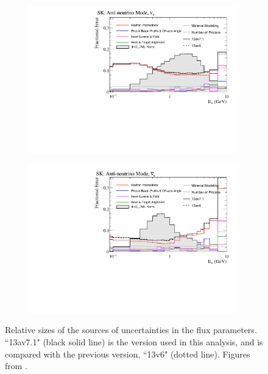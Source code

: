 \begin{figure}
\begin{subfigure}{.49\textwidth}
\end{subfigure}
\begin{subfigure}{.49\textwidth}
  \centering
  \includegraphics[width=0.99\linewidth]{figs/flux_error_t2k_sk_rhc_nue}
\end{subfigure}
\begin{subfigure}{.49\textwidth}
  \centering
  \includegraphics[width=0.99\linewidth]{figs/flux_error_t2k_sk_rhc_nuebar}
\end{subfigure}
\caption{Relative sizes of the sources of uncertainties in the \SK flux parameters. ``13av7.1" (black solid line) is the version used in this analysis, and is compared with the previous version, ``13v6" (dotted line). Figures from \cite{tn401}.}\label{fig:fluxsourceSK}
\end{figure}

